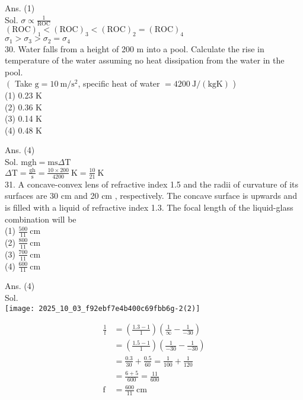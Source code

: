 \documentclass[10pt]{article}
\begin{document}
Ans. (1)\\
Sol. \(\sigma \propto \frac{1}{\mathrm{ROC}}\)\\
\((\mathrm{ROC})_{1}<(\mathrm{ROC})_{3}<(\mathrm{ROC})_{2}=(\mathrm{ROC})_{4}\)\\
\(\sigma_{1}>\sigma_{3}>\sigma_{2}=\sigma_{4}\)\\
30. Water falls from a height of 200 m into a pool. Calculate the rise in temperature of the water assuming no heat dissipation from the water in the pool.\\
\(\left(\right.\) Take \(\mathrm{g}=10 \mathrm{~m} / \mathrm{s}^{2}\), specific heat of water \(=4200 \mathrm{~J} /(\mathrm{kg} \mathrm{K})\) )\\
(1) 0.23 K\\
(2) 0.36 K\\
(3) 0.14 K\\
(4) 0.48 K

Ans. (4)\\
Sol. \(\mathrm{mgh}=\mathrm{ms} \Delta \mathrm{T}\)\\
\(\Delta \mathrm{T}=\frac{\mathrm{gh}}{\mathrm{s}}=\frac{10 \times 200}{4200} \mathrm{~K}=\frac{10}{21} \mathrm{~K}\)\\
31. A concave-convex lens of refractive index 1.5 and the radii of curvature of its surfaces are 30 cm and 20 cm , respectively. The concave surface is upwards and is filled with a liquid of refractive index 1.3. The focal length of the liquid-glass combination will be\\
(1) \(\frac{500}{11} \mathrm{~cm}\)\\
(2) \(\frac{800}{11} \mathrm{~cm}\)\\
(3) \(\frac{700}{11} \mathrm{~cm}\)\\
(4) \(\frac{600}{11} \mathrm{~cm}\)

Ans. (4)\\
Sol.\\
\texttt{[image: 2025\_10\_03\_f92ebf7e4b400c69fbb6g-2(2)]}

\[
\begin{aligned}
\frac{1}{\mathrm{f}} & =\left(\frac{1.3-1}{1}\right)\left(\frac{1}{\infty}-\frac{1}{-30}\right) \\
& =\left(\frac{1.5-1}{1}\right)\left(\frac{1}{-30}-\frac{1}{-30}\right) \\
& =\frac{0.3}{30}+\frac{0.5}{60}=\frac{1}{100}+\frac{1}{120} \\
& =\frac{6+5}{600}=\frac{11}{600} \\
\mathrm{f} & =\frac{600}{11} \mathrm{~cm}
\end{aligned}
\]
\end{document}
